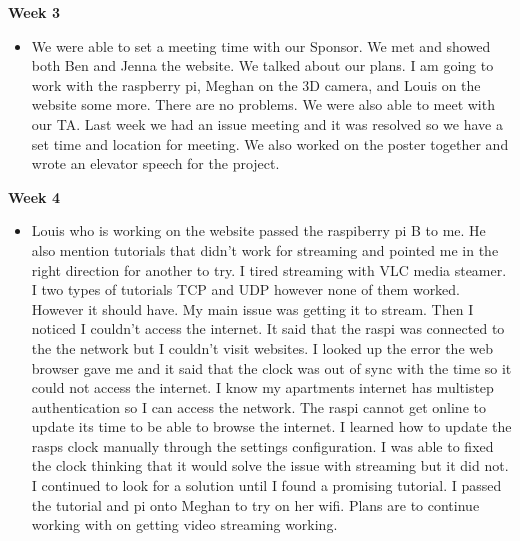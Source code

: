 \documentclass[onecolumn, draftclsnofoot,10pt, compsoc]{IEEEtran}
\begin{document}
            \textbf{Week 3}
            \begin{itemize}
                \item We were able to set a meeting time with our Sponsor. We met and showed both Ben and Jenna the website. We talked about our plans. I am going to work with the raspberry pi, Meghan on the 3D camera, and Louis on the website some more. There are no problems. We were also able to meet with our TA. Last week we had an issue meeting and it was resolved so we have a set time and location for meeting. We also worked on the poster together and wrote an elevator speech for the project.
            \end{itemize}
            \newpage
            \textbf{Week 4}
            \begin{itemize}
                \item Louis who is working on the website passed the raspiberry pi B to me. He also mention tutorials that didn't work for streaming and pointed me in the right direction for another to try. I tired streaming with VLC media steamer. I two types of tutorials TCP and UDP however none of them worked. However it should have. My main issue was getting it to stream. Then I noticed I couldn't access the internet. It said that the raspi was connected to the the network but I couldn't visit websites. I looked up the error the web browser gave me and it said that the clock was out of sync with the time so it could not access the internet. I know my apartments internet has multistep authentication so I can access the network. The raspi cannot get online to update its time to be able to browse the internet. I learned how to update the rasps clock manually through the settings configuration. I was able to fixed the clock thinking that it would solve the issue with streaming but it did not. I continued to look for a solution until I found a promising tutorial. I passed the tutorial and pi onto Meghan to try on her wifi. Plans are to continue working with on getting video streaming working. 
            \end{itemize}
            
\end{document}
